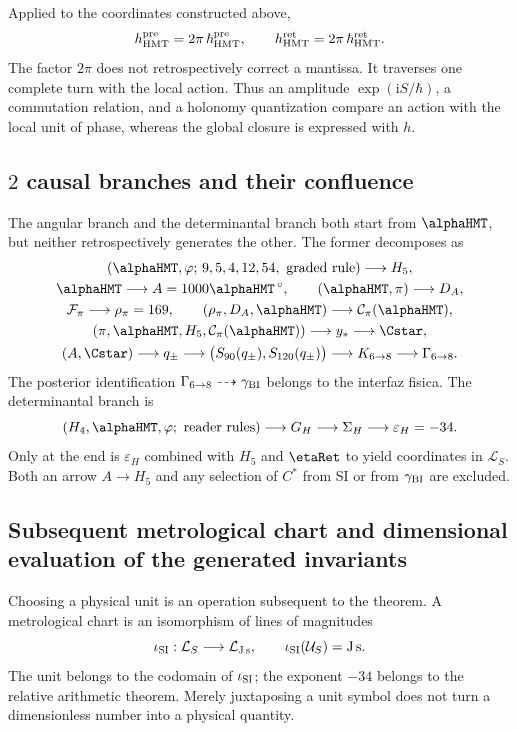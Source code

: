 Applied to the coordinates constructed above,
\[
 h_{\rm HMT}^{\rm pre}
 =2\pi\,\hbar_{\rm HMT}^{\rm pre},\qquad
 h_{\rm HMT}^{\rm ret}
 =2\pi\,\hbar_{\rm HMT}^{\rm ret}.
\]
The factor \(2\pi\) does not retrospectively correct a mantissa. It traverses one
complete turn with the local action. Thus an amplitude
\(\exp(\mathrm iS/\hbar)\), a commutation relation, and a holonomy
quantization compare an action with the local unit of phase, whereas the
global closure is expressed with \(h\).

\subsection{\(2\) causal branches and their confluence}

The angular branch and the determinantal branch both start from
\(\alphaHMT\), but neither retrospectively generates the other. The former
decomposes as
\[
\begin{gathered}
(\alphaHMT,\varphi;\,9,5,4,12,54,\text{ graded rule})
\longrightarrow H_5,\\
\alphaHMT\longrightarrow A=1000\alphaHMT\,{}^\circ,
\qquad
(\alphaHMT,\pi)\longrightarrow D_A,\\
\mathcal F_\pi\longrightarrow\rho_\pi=169,\qquad
(\rho_\pi,D_A,\alphaHMT)\longrightarrow\mathcal C_\pi(\alphaHMT),\\
(\pi,\alphaHMT,H_5,\mathcal C_\pi(\alphaHMT))
\longrightarrow y_*\longrightarrow\Cstar,\\
(A,\Cstar)\longrightarrow q_\pm
\longrightarrow\bigl(S_{90}(q_\pm),S_{120}(q_\pm)\bigr)
\longrightarrow K_{6\to8}
\longrightarrow\Gamma_{6\to8}.
\end{gathered}
\]
The posterior identification
\(\Gamma_{6\to8}\dashrightarrow\gamma_{\rm BI}\) belongs to the interfaz
fisica. The determinantal branch is
\[
(H_4,\alphaHMT,\varphi;\text{ reader rules})
\longrightarrow G_H
\longrightarrow\Sigma_H
\longrightarrow\varepsilon_H=-34.
\]
Only at the end is \(\varepsilon_H\) combined with \(H_5\) and \(\etaRet\) to
yield coordinates in \(\mathcal L_S\). Both an arrow
\(A\to H_5\) and any selection of \(C^*\) from SI or from
\(\gamma_{\rm BI}\) are excluded.

\subsection{Subsequent metrological chart and dimensional evaluation of the generated invariants}

Choosing a physical unit is an operation subsequent to the theorem. A
metrological chart is an isomorphism of lines of magnitudes
\[
\iota_{\rm SI}:\mathcal L_S\longrightarrow\mathcal L_{\mathrm{J\,s}},
\qquad
\iota_{\rm SI}(\mathcal U_S)=\mathrm{J\,s}.
\]
The unit belongs to the codomain of \(\iota_{\rm SI}\); the exponent
\(-34\) belongs to the relative arithmetic theorem. Merely juxtaposing a
unit symbol does not turn a dimensionless number into a
physical quantity.

